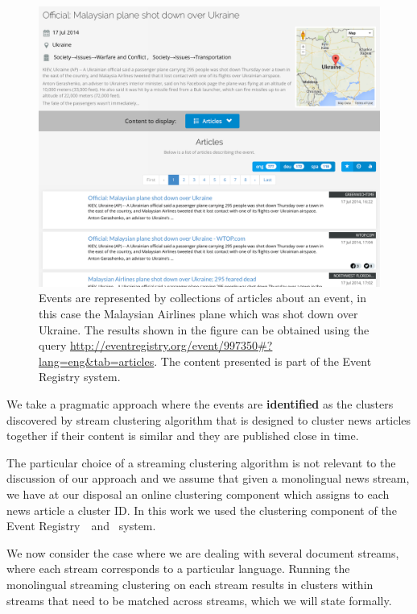 \begin{figure}
\centering
\includegraphics[width=1\textwidth]{figures/events2.png}
\caption[An example of an event]{Events are represented by collections of articles about an event, in
this case the Malaysian Airlines plane which was shot down over Ukraine. The results shown in the figure can be obtained using the query \url{http://eventregistry.org/event/997350\#?lang=eng\&tab=articles}. The
content presented is part of the Event Registry system.}
\label{fig:event2}
\end{figure}


We take a pragmatic approach where the events are \textbf{identified} as the clusters
discovered by stream clustering algorithm that is designed to cluster
news articles together if their content is similar and they are published
close in time.

The particular choice of a streaming clustering algorithm is not relevant
to the discussion of our approach and we assume that given a monolingual news stream, we have
at our disposal an online clustering component which assigns to each news
article a cluster ID. In this work we used the clustering
component of the Event Registry~\cite{Leban2014W}~and~\cite{Leban2014I} system.

We now consider the case where we are dealing with several document streams, where each
stream corresponds to a particular language. Running the monolingual streaming clustering
on each stream results in clusters within streams that need to be matched across streams,
which we will state formally.

